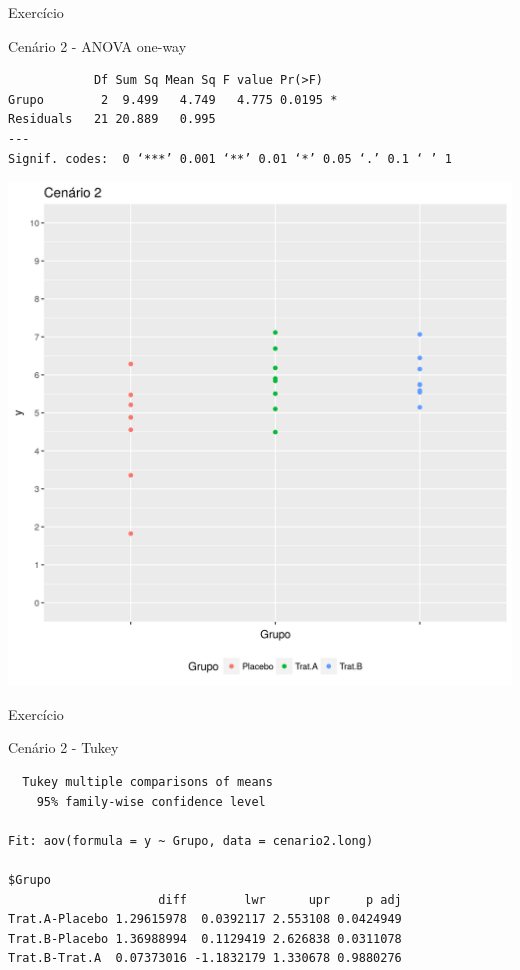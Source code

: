 \documentclass{beamer}
\begin{document}
\begin{frame}[fragile]{Exercício}
  \begin{exampleblock}{Cenário 2 - ANOVA one-way}
    \tiny
\begin{verbatim}
            Df Sum Sq Mean Sq F value Pr(>F)  
Grupo        2  9.499   4.749   4.775 0.0195 *
Residuals   21 20.889   0.995                 
---
Signif. codes:  0 ‘***’ 0.001 ‘**’ 0.01 ‘*’ 0.05 ‘.’ 0.1 ‘ ’ 1
\end{verbatim}
    \begin{center}
      \includegraphics[height=.5\textheight]{Cap13-30/cenario2}
    \end{center}
  \end{exampleblock}
\end{frame}

\begin{frame}[fragile]{Exercício}
  \begin{exampleblock}{Cenário 2 - Tukey}
    \tiny
\begin{verbatim}
  Tukey multiple comparisons of means
    95% family-wise confidence level

Fit: aov(formula = y ~ Grupo, data = cenario2.long)

$Grupo
                     diff        lwr      upr     p adj
Trat.A-Placebo 1.29615978  0.0392117 2.553108 0.0424949
Trat.B-Placebo 1.36988994  0.1129419 2.626838 0.0311078
Trat.B-Trat.A  0.07373016 -1.1832179 1.330678 0.9880276
\end{verbatim}
  \end{exampleblock}
\end{frame}
\end{document}
